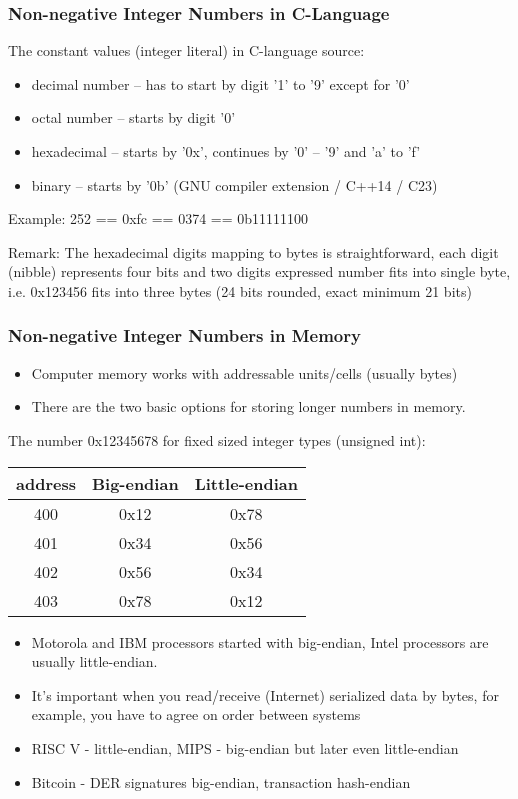 \documentclass{beamer}
\begin{document}
\begin{frame}
\frametitle{Non-negative Integer Numbers in C-Language}
The constant values (integer literal) in C-language source:
\begin{itemize}
\item decimal number -- has to start by digit '1' to '9' except for '0'
\item octal number -- starts by digit '0'
\item hexadecimal -- starts by '0x', continues by '0' -- '9' and 'a' to 'f'
\item binary -- starts by '0b' (GNU compiler extension / C++14 / C23)
\end{itemize}
\bigskip
Example: 252 == 0xfc == 0374 == 0b11111100
\bigskip

Remark: The hexadecimal digits mapping to bytes is straightforward, each digit (nibble) represents four bits and two digits expressed number fits into single byte, i.e. 0x123456 fits into three bytes (24 bits rounded, exact minimum 21 bits)
\end{frame}


\begin{frame}
\frametitle{Non-negative Integer Numbers in Memory}

\begin{itemize}
\item Computer memory works with addressable units/cells (usually bytes)
\item There are the two basic options for storing longer numbers in memory.
\end{itemize}

The number 0x12345678 for fixed sized integer types (unsigned int):
\begin{tabular}{|c|c|c|}\hline
address & Big-endian & Little-endian \\ \hline
400 & 0x12 & 0x78 \\ \hline
401 & 0x34 & 0x56 \\ \hline
402 & 0x56 & 0x34 \\ \hline
403 & 0x78 & 0x12 \\ \hline
\end{tabular}

\begin{itemize}
\item Motorola and IBM processors started with big-endian, Intel processors are usually little-endian.
\item It's important when you read/receive (Internet) serialized data by bytes, for example, you have to agree on order between systems
\item RISC V - little-endian, MIPS - big-endian but later even little-endian
\item Bitcoin - DER signatures big-endian, transaction hash-endian
\end{itemize}
\end{frame}
\end{document}
